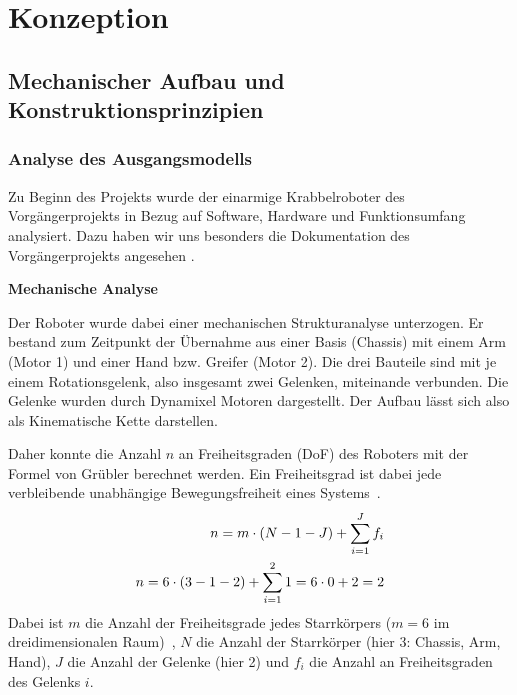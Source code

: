 \section{Konzeption}
\label{sec:konzeption}


\subsection{Mechanischer Aufbau und Konstruktionsprinzipien}

\subsubsection{Analyse des Ausgangsmodells}

Zu Beginn des Projekts wurde der einarmige Krabbelroboter des Vorgängerprojekts in Bezug auf Software, Hardware und Funktionsumfang analysiert. Dazu haben wir uns besonders die Dokumentation des Vorgängerprojekts angesehen \cite{vorgängerprojekt}. 

\textbf{Mechanische Analyse}

Der Roboter wurde dabei einer mechanischen Strukturanalyse unterzogen. Er bestand zum Zeitpunkt der Übernahme aus einer Basis (Chassis) mit einem Arm (Motor 1) und einer Hand bzw. Greifer (Motor 2). Die drei Bauteile sind mit je einem Rotationsgelenk, also insgesamt zwei Gelenken, miteinande verbunden. Die Gelenke wurden durch Dynamixel Motoren dargestellt. Der Aufbau lässt sich also als Kinematische Kette darstellen.

Daher konnte die Anzahl $n$ an Freiheitsgraden (DoF) des Roboters mit der Formel von Grübler berechnet werden. Ein Freiheitsgrad ist dabei \glqq jede verbleibende unabhängige Bewegungsfreiheit eines Systems\grqq \ \cite{robotik_scriptum}.
\begin{align}
  n = m \cdot (N - 1 - J) + \sum_{i=1}^{J}f_i \noindent \\
  n = 6 \cdot (3 - 1 - 2) + \sum_{i=1}^{2}1 = 6 \cdot 0 + 2 = 2
\end{align}
Dabei ist \glqq $m$ die Anzahl der Freiheitsgrade jedes Starrkörpers ($m = 6$ im dreidimensionalen Raum)\grqq \ \cite{robotik_scriptum}, $N$ die Anzahl der Starrkörper (hier 3: Chassis, Arm, Hand), $J$ die Anzahl der Gelenke (hier 2) und $f_i$ die Anzahl an Freiheitsgraden des Gelenks $i$. 

